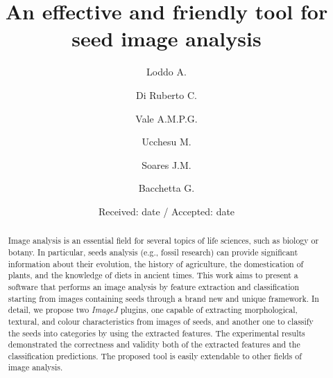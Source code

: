 \documentclass{svjour3}                     %
\begin{document}
\title{An effective and friendly tool for seed image analysis}


\author{Loddo A. \and
	Di Ruberto C. \and
	Vale A.M.P.G. \and
	Ucchesu M. \and
	Soares J.M. \and
	Bacchetta G.
}



\date{Received: date / Accepted: date}

\maketitle

\begin{abstract}
	Image analysis is an essential field for several topics of life sciences, such as biology or botany. In particular, seeds analysis (e.g., fossil research) can provide significant information about their evolution, the history of agriculture, the domestication of plants, and the knowledge of diets in ancient times. This work aims to present a software that performs an image analysis by feature extraction and classification starting from images containing seeds through a brand new and unique framework. In detail, we propose two \emph{ImageJ} plugins, one capable of extracting morphological, textural, and colour characteristics from images of seeds, and another one to classify the seeds into categories by using the extracted features. The experimental results demonstrated the correctness and validity both of the extracted features and the classification predictions. The proposed tool is easily extendable to other fields of image analysis.
\end{abstract}
\end{document}

